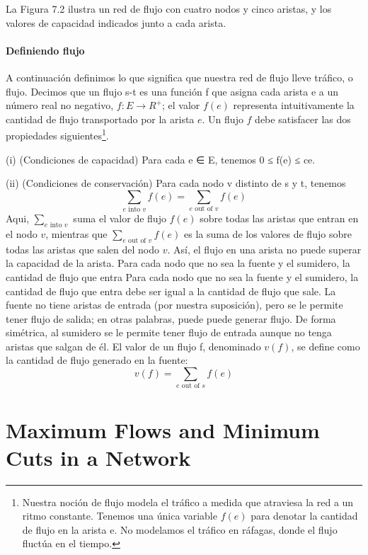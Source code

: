 \documentclass[a4paper, 12pt]{book}
\theoremstyle{dotless}
\begin{document}
La Figura 7.2 ilustra un red de flujo con cuatro nodos y cinco aristas, y los valores de capacidad indicados junto a cada arista.

\paragraph{Definiendo flujo} A continuación definimos lo que significa que nuestra red de flujo lleve tráfico, o flujo.  Decimos que un flujo s-t es una función f que asigna cada arista e a un número real no negativo, $f : E \rightarrow R^+$; el valor $f(e)$ representa intuitivamente la cantidad de flujo transportado por la arista $e$. Un flujo $f$ debe satisfacer las dos propiedades siguientes\footnote{Nuestra noción de flujo modela el tráfico a medida que atraviesa la red a un ritmo constante. Tenemos una única
variable $f(e)$ para denotar la cantidad de flujo en la arista e. No modelamos el tráfico en ráfagas, donde el flujo
fluctúa en el tiempo.}.

(i) (Condiciones de capacidad) Para cada e ∈ E, tenemos 0 ≤ f(e) ≤ ce.

(ii) (Condiciones de conservación) Para cada nodo v distinto de s y t, tenemos
%
$$
\sum_{e \text { into } v} f(e)=\sum_{e \text { out of } v} f(e)
$$
%
Aqui, $\sum_{e \text { into } v}$ suma el valor de flujo $f(e)$ sobre todas las aristas que entran en el nodo $v$, mientras que $\sum_{e \text { out of } v} f(e)$ es la suma de los valores de flujo sobre todas las aristas que salen del nodo $v$.
Así, el flujo en una arista no puede superar la capacidad de la arista. Para cada nodo que no sea la fuente y el sumidero, la cantidad de flujo que entra Para cada nodo que no sea la fuente y el sumidero, la cantidad de flujo que entra debe ser igual a la cantidad de flujo que sale. La fuente no tiene aristas de entrada (por nuestra suposición), pero se le permite tener flujo de salida; en otras palabras, puede puede generar flujo. De forma simétrica, al sumidero se le permite tener flujo de entrada aunque no tenga aristas que salgan de él. El valor de un flujo f, denominado $v(f)$, se define como la cantidad de flujo generado en la fuente:
%
$$
v(f)=\sum_{e \text { out of } s} f(e)
$$
%





\section{Maximum Flows and Minimum Cuts in a Network}
\end{document}
